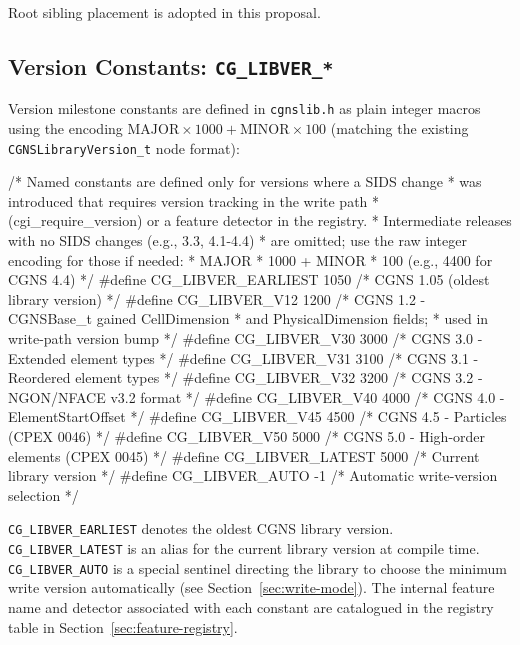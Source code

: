 \documentclass[11pt,letterpaper]{article}
\makeatletter
\let\cgns@orig@lstlisting\lstlisting
\let\cgns@endorig@lstlisting\endlstlisting
\renewenvironment{lstlisting}
  {\par\needspace{5\baselineskip}\nolinenumbers\cgns@orig@lstlisting}
  {\cgns@endorig@lstlisting\par\linenumbers}
\makeatother
\begin{document}
Root sibling placement is adopted in this proposal.

\subsection{Version Constants: \texttt{CG\_LIBVER\_*}}
\label{sec:version-constants}

Version milestone constants are defined in \texttt{cgnslib.h} as
plain integer macros using the encoding
$\mathrm{MAJOR} \times 1000 + \mathrm{MINOR} \times 100$
(matching the existing \texttt{CGNSLibraryVersion\_t} node format):

\begin{lstlisting}[language=C]
/* Named constants are defined only for versions where a SIDS change
 * was introduced that requires version tracking in the write path
 * (cgi_require_version) or a feature detector in the registry.
 * Intermediate releases with no SIDS changes (e.g., 3.3, 4.1-4.4)
 * are omitted; use the raw integer encoding for those if needed:
 *   MAJOR * 1000 + MINOR * 100  (e.g., 4400 for CGNS 4.4)
 */
#define CG_LIBVER_EARLIEST  1050  /* CGNS 1.05 (oldest library version) */
#define CG_LIBVER_V12       1200  /* CGNS 1.2  - CGNSBase_t gained CellDimension
                                   *             and PhysicalDimension fields;
                                   *             used in write-path version bump */
#define CG_LIBVER_V30       3000  /* CGNS 3.0  - Extended element types */
#define CG_LIBVER_V31       3100  /* CGNS 3.1  - Reordered element types */
#define CG_LIBVER_V32       3200  /* CGNS 3.2  - NGON/NFACE v3.2 format */
#define CG_LIBVER_V40       4000  /* CGNS 4.0  - ElementStartOffset */
#define CG_LIBVER_V45       4500  /* CGNS 4.5  - Particles (CPEX 0046) */
#define CG_LIBVER_V50       5000  /* CGNS 5.0  - High-order elements (CPEX 0045) */
#define CG_LIBVER_LATEST    5000  /* Current library version */
#define CG_LIBVER_AUTO        -1  /* Automatic write-version selection */
\end{lstlisting}

\texttt{CG\_LIBVER\_EARLIEST} denotes the oldest CGNS library
version.  \texttt{CG\_LIBVER\_LATEST} is an alias for
the current library version at compile time.
\texttt{CG\_LIBVER\_AUTO} is a special sentinel directing the library
to choose the minimum write version automatically (see
Section~\ref{sec:write-mode}).
The internal feature name and detector associated with each constant
are catalogued in the registry table in
Section~\ref{sec:feature-registry}.
\end{document}
